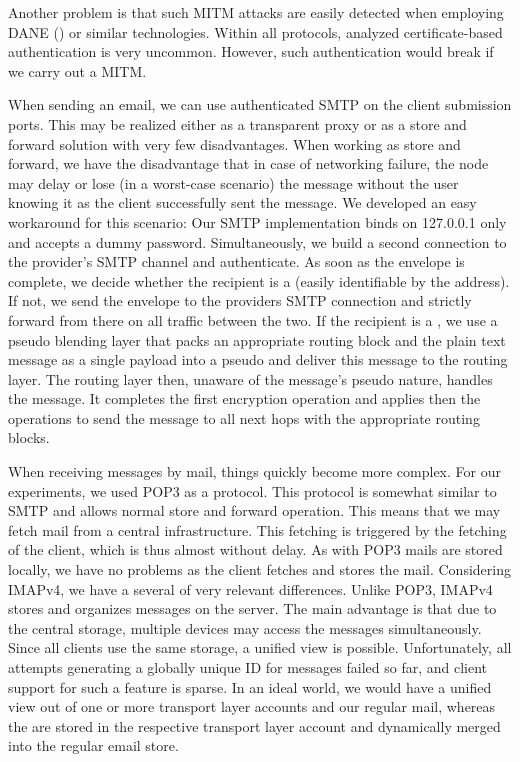 Another problem is that such MITM attacks are easily detected when employing DANE (\cite{rfc6698,rfc7672}) or similar technologies. Within all protocols, analyzed certificate-based authentication is very uncommon. However, such authentication would break if we carry out a MITM.

When sending an email, we can use authenticated SMTP on the client submission ports. This may be realized either as a transparent proxy or as a store and forward solution with very few disadvantages. When working as store and forward, we have the disadvantage that in case of networking failure, the node may delay or lose (in a worst-case scenario) the message without the user knowing it as the client successfully sent the message. We developed an easy workaround for this scenario: Our SMTP implementation binds on 127.0.0.1 only and accepts a dummy password. Simultaneously, we build a second connection to the provider's SMTP channel and authenticate. As soon as the envelope is complete, we decide whether the recipient is a \VortexNode{} (easily identifiable by the address). If not, we send the envelope to the providers SMTP connection and strictly forward from there on all traffic between the two. If the recipient is a \VortexNode{}, we use a pseudo blending layer that packs an appropriate routing block and the plain text message as a single payload into a pseudo \VortexMessage{} and deliver this message to the routing layer. The routing layer then, unaware of the message's pseudo nature, handles the message. It completes the first encryption operation and applies then the operations to send the message to all next hops with the appropriate routing blocks.

When receiving messages by mail, things quickly become more complex. For our experiments, we used POP3 as a protocol. This protocol is somewhat similar to SMTP and allows normal store and forward operation. This means that we may fetch mail from a central infrastructure. This fetching is triggered by the fetching of the client, which is thus almost without delay. As with POP3 mails are stored locally, we have no problems as the client fetches and stores the mail. Considering IMAPv4, we have a several of very relevant differences. Unlike POP3, IMAPv4 stores and organizes messages on the server. The main advantage is that due to the central storage, multiple devices may access the messages simultaneously. Since all clients use the same storage, a unified view is possible. Unfortunately, all attempts generating a globally unique ID for messages failed so far, and client support for such a feature is sparse. In an ideal world, we would have a unified view out of one or more \MessageVortex{} transport layer accounts and our regular mail, whereas the \VortexMessages{} are stored in the respective transport layer account and dynamically merged into the regular email store. 

